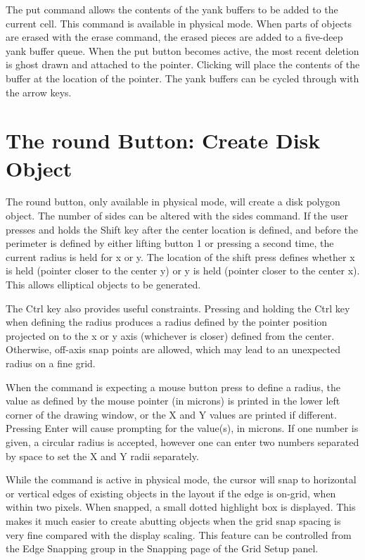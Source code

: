 The {\cb put} command allows the contents of the yank buffers to be
added to the current cell.  This command is available in physical
mode.  When parts of objects are erased with the {\cb erase} command,
the erased pieces are added to a five-deep yank buffer queue.  When
the {\cb put} button becomes active, the most recent deletion is ghost
drawn and attached to the pointer.  Clicking will place the contents
of the buffer at the location of the pointer.  The yank buffers can be
cycled through with the arrow keys.


\section{The {\cb round} Button: Create Disk Object}

The {\cb round} button, only available in physical mode, will create a
disk polygon object.  The number of sides can be altered with the {\cb
sides} command.  If the user presses and holds the {\kb Shift} key
after the center location is defined, and before the perimeter is
defined by either lifting button 1 or pressing a second time, the
current radius is held for x or y.  The location of the shift press
defines whether x is held (pointer closer to the center y) or y is
held (pointer closer to the center x).  This allows elliptical objects
to be generated.

The {\kb Ctrl} key also provides useful constraints.  Pressing and
holding the {\kb Ctrl} key when defining the radius produces a radius
defined by the pointer position projected on to the {\et x} or {\et y}
axis (whichever is closer) defined from the center.  Otherwise,
off-axis snap points are allowed, which may lead to an unexpected
radius on a fine grid.

When the command is expecting a mouse button press to define a radius,
the value as defined by the mouse pointer (in microns) is printed in
the lower left corner of the drawing window, or the X and Y values are
printed if different.  Pressing {\kb Enter} will cause prompting for
the value(s), in microns.  If one number is given, a circular radius
is accepted, however one can enter two numbers separated by space to
set the X and Y radii separately.

While the command is active in physical mode, the cursor will snap to
horizontal or vertical edges of existing objects in the layout if the
edge is on-grid, when within two pixels.  When snapped, a small dotted
highlight box is displayed.  This makes it much easier to create
abutting objects when the grid snap spacing is very fine compared with
the display scaling.  This feature can be controlled from the {\cb
Edge Snapping} group in the {\cb Snapping} page of the {\cb Grid
Setup} panel.

